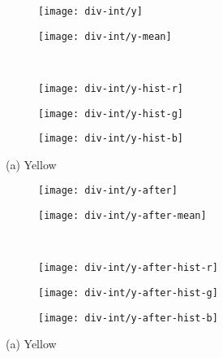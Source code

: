 \begin{figure}
	\centering
	\begin{subfigure}[b]{0.4\textwidth}
		\texttt{[image: div-int/y]}
		\caption{}
		\label{fig:y-before}
	\end{subfigure}
	\begin{subfigure}[b]{0.4\textwidth}
		\texttt{[image: div-int/y-mean]}
		\caption{}
		\label{fig:y-mean}
	\end{subfigure}
	\\
	\begin{subfigure}[b]{0.3\textwidth}
		\texttt{[image: div-int/y-hist-r]}
		\caption{}
		\label{fig:y-hist-r}
	\end{subfigure}
	\begin{subfigure}[b]{0.3\textwidth}
		\texttt{[image: div-int/y-hist-g]}
		\caption{}
		\label{fig:y-hist-g}
	\end{subfigure}
	\begin{subfigure}[b]{0.3\textwidth}
		\texttt{[image: div-int/y-hist-b]}
		\caption{}
		\label{fig:y-hist-b}
	\end{subfigure}
	\caption{(a) Yellow }
	\label{fig:yellow}
\end{figure}

\begin{figure}
	\centering
	\begin{subfigure}[b]{0.4\textwidth}
		\texttt{[image: div-int/y-after]}
		\caption{}
		\label{fig:y-after}
	\end{subfigure}
	\begin{subfigure}[b]{0.4\textwidth}
		\texttt{[image: div-int/y-after-mean]}
		\caption{}
		\label{fig:y-after-mean}
	\end{subfigure}
	\\
	\begin{subfigure}[b]{0.3\textwidth}
		\texttt{[image: div-int/y-after-hist-r]}
		\caption{}
		\label{fig:y-after-hist-r}
	\end{subfigure}
	\begin{subfigure}[b]{0.3\textwidth}
		\texttt{[image: div-int/y-after-hist-g]}
		\caption{}
		\label{fig:y-after-hist-g}
	\end{subfigure}
	\begin{subfigure}[b]{0.3\textwidth}
		\texttt{[image: div-int/y-after-hist-b]}
		\caption{}
		\label{fig:y-after-hist-b}
	\end{subfigure}
	\caption{(a) Yellow }
	\label{fig:yellow-after}
\end{figure}


